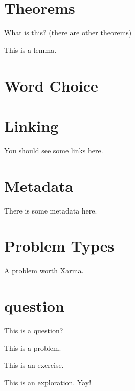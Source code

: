 \documentclass{ximera}
\begin{document}
\section{Theorems}

\begin{theorem}
What is this? (there are other theorems)
\end{theorem}

\begin{lemma}
This is a lemma.
\end{lemma}



\section{Word Choice}



\section{Linking}

You should see some links here.

\link{} %



\section{Metadata}

There is some metadata here.





\section{Problem Types}

\begin{xarmaBoost}
A problem worth Xarma.
\end{xarmaBoost}

\section{question}

\begin{question}
This is a question?
\end{question}

\begin{problem}
This is a problem.
\end{problem}

\begin{exercise}
This is an exercise.
\end{exercise}

\begin{exploration}
This is an exploration. Yay!
\end{exploration}
\end{document}
